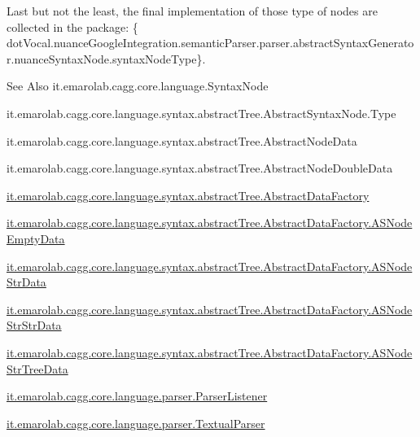 Last but not the least, the final implementation of those type of nodes are collected in the package\-: \{ dot\-Vocal.\-nuance\-Google\-Integration.\-semantic\-Parser.\-parser.\-abstract\-Syntax\-Generator.\-nuance\-Syntax\-Node.\-syntax\-Node\-Type\}. 

\begin{DoxySeeAlso}{See Also}
it.\-emarolab.\-cagg.\-core.\-language.\-Syntax\-Node 

it.\-emarolab.\-cagg.\-core.\-language.\-syntax.\-abstract\-Tree.\-Abstract\-Syntax\-Node.\-Type 

it.\-emarolab.\-cagg.\-core.\-language.\-syntax.\-abstract\-Tree.\-Abstract\-Node\-Data 

it.\-emarolab.\-cagg.\-core.\-language.\-syntax.\-abstract\-Tree.\-Abstract\-Node\-Double\-Data 

\hyperlink{classit_1_1emarolab_1_1cagg_1_1core_1_1language_1_1syntax_1_1abstractTree_1_1AbstractDataFactory}{it.\-emarolab.\-cagg.\-core.\-language.\-syntax.\-abstract\-Tree.\-Abstract\-Data\-Factory} 

\hyperlink{classit_1_1emarolab_1_1cagg_1_1core_1_1language_1_1syntax_1_1abstractTree_1_1AbstractDataFactory_1_1ASNodeEmptyData}{it.\-emarolab.\-cagg.\-core.\-language.\-syntax.\-abstract\-Tree.\-Abstract\-Data\-Factory.\-A\-S\-Node\-Empty\-Data} 

\hyperlink{classit_1_1emarolab_1_1cagg_1_1core_1_1language_1_1syntax_1_1abstractTree_1_1AbstractDataFactory_1_1ASNodeStrData}{it.\-emarolab.\-cagg.\-core.\-language.\-syntax.\-abstract\-Tree.\-Abstract\-Data\-Factory.\-A\-S\-Node\-Str\-Data} 

\hyperlink{classit_1_1emarolab_1_1cagg_1_1core_1_1language_1_1syntax_1_1abstractTree_1_1AbstractDataFactory_1_1ASNodeStrStrData}{it.\-emarolab.\-cagg.\-core.\-language.\-syntax.\-abstract\-Tree.\-Abstract\-Data\-Factory.\-A\-S\-Node\-Str\-Str\-Data} 

\hyperlink{classit_1_1emarolab_1_1cagg_1_1core_1_1language_1_1syntax_1_1abstractTree_1_1AbstractDataFactory_1_1ASNodeStrTreeData}{it.\-emarolab.\-cagg.\-core.\-language.\-syntax.\-abstract\-Tree.\-Abstract\-Data\-Factory.\-A\-S\-Node\-Str\-Tree\-Data} 

\hyperlink{classit_1_1emarolab_1_1cagg_1_1core_1_1language_1_1parser_1_1ParserListener}{it.\-emarolab.\-cagg.\-core.\-language.\-parser.\-Parser\-Listener} 

\hyperlink{classit_1_1emarolab_1_1cagg_1_1core_1_1language_1_1parser_1_1TextualParser}{it.\-emarolab.\-cagg.\-core.\-language.\-parser.\-Textual\-Parser}
\end{DoxySeeAlso}

